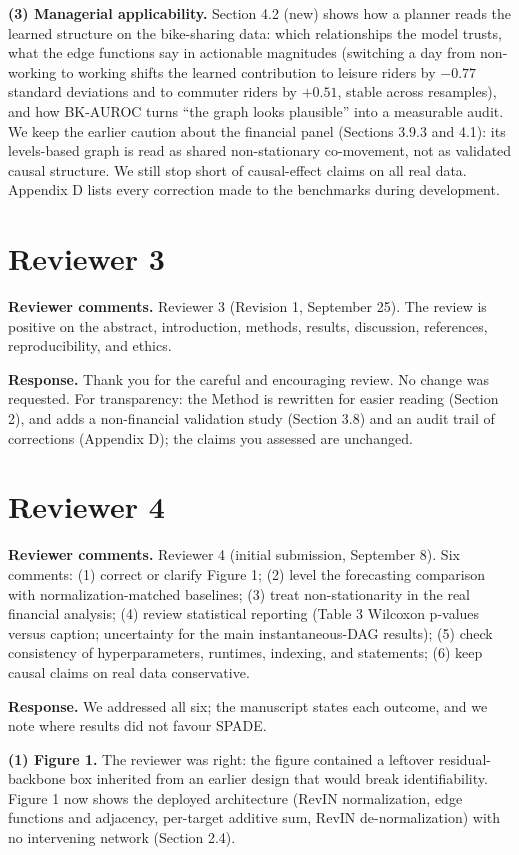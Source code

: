 \documentclass[11pt]{article}
\begin{document}
\textbf{(3) Managerial applicability.} Section 4.2 (new) shows how a planner reads the learned structure on the bike-sharing data: which relationships the model trusts, what the edge functions say in actionable magnitudes (switching a day from non-working to working shifts the learned contribution to leisure riders by $-0.77$ standard deviations and to commuter riders by $+0.51$, stable across resamples), and how BK-AUROC turns ``the graph looks plausible'' into a measurable audit. We keep the earlier caution about the financial panel (Sections 3.9.3 and 4.1): its levels-based graph is read as shared non-stationary co-movement, not as validated causal structure. We still stop short of causal-effect claims on all real data. Appendix D lists every correction made to the benchmarks during development.

\section*{Reviewer 3}
\textbf{Reviewer comments.} Reviewer 3 (Revision 1, September 25). The review is positive on the abstract, introduction, methods, results, discussion, references, reproducibility, and ethics.

\textbf{Response.} Thank you for the careful and encouraging review. No change was requested. For transparency: the Method is rewritten for easier reading (Section 2), and adds a non-financial validation study (Section 3.8) and an audit trail of corrections (Appendix D); the claims you assessed are unchanged.

\section*{Reviewer 4}
\textbf{Reviewer comments.} Reviewer 4 (initial submission, September 8). Six comments: (1) correct or clarify Figure 1; (2) level the forecasting comparison with normalization-matched baselines; (3) treat non-stationarity in the real financial analysis; (4) review statistical reporting (Table 3 Wilcoxon p-values versus caption; uncertainty for the main instantaneous-DAG results); (5) check consistency of hyperparameters, runtimes, indexing, and statements; (6) keep causal claims on real data conservative.

\textbf{Response.} We addressed all six; the manuscript states each outcome, and we note where results did not favour SPADE.

\textbf{(1) Figure 1.} The reviewer was right: the figure contained a leftover residual-backbone box inherited from an earlier design that would break identifiability. Figure 1 now shows the deployed architecture (RevIN normalization, edge functions and adjacency, per-target additive sum, RevIN de-normalization) with no intervening network (Section 2.4).
\end{document}
